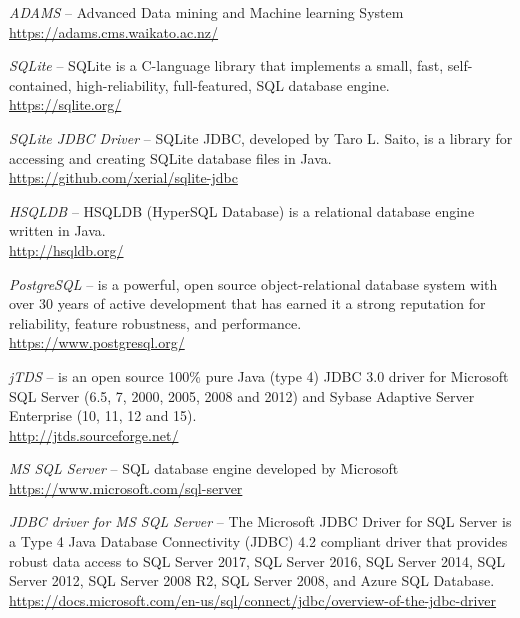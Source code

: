 
\begin{thebibliography}{999}

		\textit{ADAMS} -- Advanced Data mining and Machine learning System \\
		\url{https://adams.cms.waikato.ac.nz/}{}
		
		\textit{SQLite} -- SQLite is a C-language library that implements
		a small, fast, self-contained, high-reliability, full-featured,
		SQL database engine. \\
		\url{https://sqlite.org/}{}

		\textit{SQLite JDBC Driver} -- SQLite JDBC, developed by
		Taro L. Saito, is a library for accessing and creating SQLite
		database files in Java.  \\
		\url{https://github.com/xerial/sqlite-jdbc}{}

		\textit{HSQLDB} -- HSQLDB (HyperSQL Database) is a relational
		database engine written in Java. \\
		\url{http://hsqldb.org/}{}

		\textit{PostgreSQL} --  is a powerful, open source object-relational
		database system with over 30 years of active development that has
		earned it a strong reputation for reliability, feature robustness,
		and performance.  \\
		\url{https://www.postgresql.org/}{}

		\textit{jTDS} -- is an open source 100\% pure
		Java (type 4) JDBC 3.0 driver for Microsoft SQL Server (6.5, 7,
		2000, 2005, 2008 and 2012) and Sybase Adaptive Server Enterprise
		(10, 11, 12 and 15). \\
		\url{http://jtds.sourceforge.net/}{}

		\textit{MS SQL Server} -- SQL database engine developed by Microsoft \\
		\url{https://www.microsoft.com/sql-server}{}

		\textit{JDBC driver for MS SQL Server} -- The Microsoft JDBC Driver
		for SQL Server is a Type 4 Java Database Connectivity (JDBC) 4.2
		compliant driver that provides robust data access to SQL Server 2017,
		SQL Server 2016, SQL Server 2014, SQL Server 2012, SQL Server 2008 R2,
		SQL Server 2008, and Azure SQL Database. \\
		\url{https://docs.microsoft.com/en-us/sql/connect/jdbc/overview-of-the-jdbc-driver}{}

\end{thebibliography}
